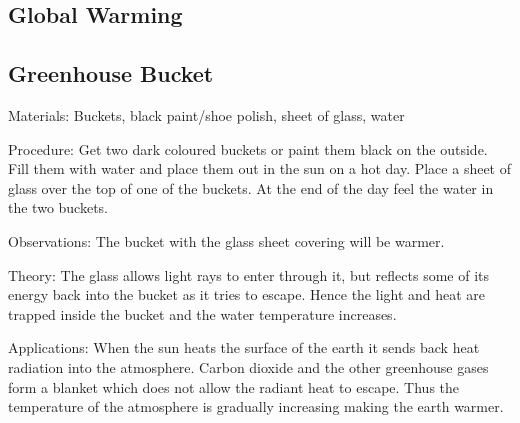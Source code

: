 \begin{multicols}{2}

\section*{Global Warming} %


\subsection{Greenhouse Bucket}


\begin{description*}
\item[Materials:]{Buckets, black paint/shoe polish, sheet of glass, water}
\item[Procedure:]{Get two dark coloured buckets or paint them black on the outside. Fill them with water and place them out in the sun on a hot day. Place a sheet of glass over the top of one of the buckets. At the end of the day feel the water in the two buckets.}
\item[Observations:]{The bucket with the glass sheet covering will be warmer.}
\item[Theory:]{The glass allows light rays to enter through it, but reflects some of its energy back into the bucket as it tries to escape. Hence the light and heat are trapped inside the bucket and the water temperature increases. }
\item[Applications:]{When the sun heats the surface of the earth it
sends back heat radiation into the atmosphere.
Carbon dioxide and the other greenhouse gases
form a blanket which does not allow the radiant
heat to escape. Thus the temperature of the
atmosphere is gradually increasing making the
earth warmer.}
\end{description*}


\end{multicols}
